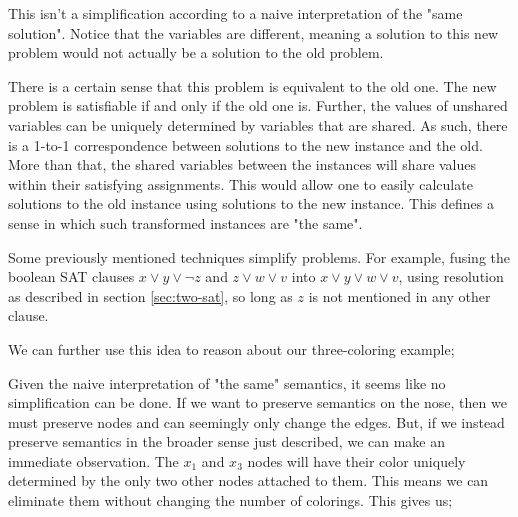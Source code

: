 This isn't a simplification according to a naive interpretation of the "same solution". Notice that the variables are different, meaning a solution to this new problem would not actually be a solution to the old problem.

There is a certain sense that this problem is equivalent to the old one. The new problem is satisfiable if and only if the old one is. Further, the values of unshared variables can be uniquely determined by variables that are shared. As such, there is a 1-to-1 correspondence between solutions to the new instance and the old. More than that, the shared variables between the instances will share values within their satisfying assignments. This would allow one to easily calculate solutions to the old instance using solutions to the new instance. This defines a sense in which such transformed instances are "the same".

Some previously mentioned techniques simplify problems. For example, fusing the boolean SAT clauses $x \vee y \vee \neg z$ and $z \vee w \vee v$ into $x \vee y \vee w \vee v$, using resolution as described in section \ref{sec:two-sat}, so long as $z$ is not mentioned in any other clause.

We can further use this idea to reason about our three-coloring example;

\begin{center}
\end{center}

Given the naive interpretation of "the same" semantics, it seems like no simplification can be done. If we want to preserve semantics on the nose, then we must preserve nodes and can seemingly only change the edges. But, if we instead preserve semantics in the broader sense just described, we can make an immediate observation. The $x_1$ and $x_3$ nodes will have their color uniquely determined by the only two other nodes attached to them. This means we can eliminate them without changing the number of colorings. This gives us;

\begin{center}
\end{center}

